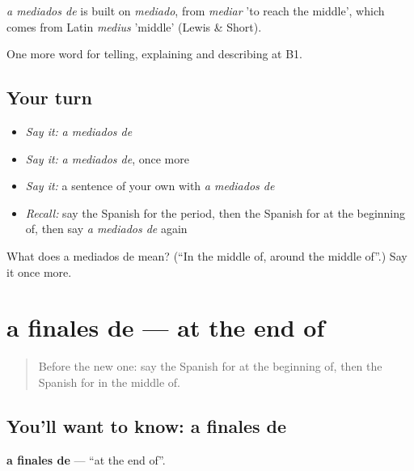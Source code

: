 \begin{cousinweb}
\emph{a mediados de} is built on \emph{mediado}, from \emph{mediar} 'to reach the middle', which comes from Latin \emph{medius} 'middle' (Lewis \& Short).
\end{cousinweb}

\begin{grammarlens}[title={What you've built}]
One more word for telling, explaining and describing at B1.
\end{grammarlens}

\subsection*{Your turn}
\begin{itemize}
\raggedright
  \item \emph{Say it:} \emph{a mediados de}
  \item \emph{Say it:} \emph{a mediados de}, once more
  \item \emph{Say it:} a sentence of your own with \emph{a mediados de}
  \item \emph{Recall:} say the Spanish for the period, then the Spanish for at the beginning of, then say \emph{a mediados de} again
\end{itemize}

\begin{tcolorbox}[breakable,colback=teal!4,colframe=teal!35!black,title={Before you move on}]
What does a mediados de mean? (\textquotedblleft{}In the middle of, around the middle of\textquotedblright{}.) Say it once more.
\end{tcolorbox}
\section[a finales de]{a finales de — at the end of}

\label{lesson:ES-C540-a-finales-de}



\begin{quote}
Before the new one: say the Spanish for at the beginning of, then the Spanish for in the middle of.
\end{quote}

\subsection*{You'll want to know: a finales de}
\textbf{a finales de} — \textquotedblleft{}at the end of\textquotedblright{}.

